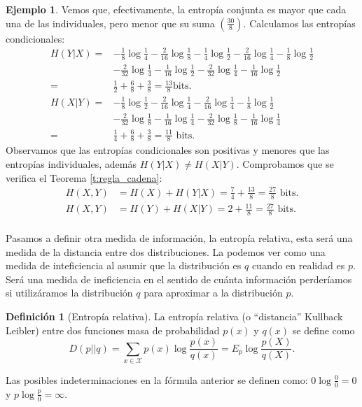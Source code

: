 \documentclass[10pt,a4paper]{article} %
\theoremstyle{definition}
\newtheorem{definition}{Definición}[section]
\newtheorem{example}[theorem]{Ejemplo}
\begin{document}
\begin{example}
  Vemos que, efectivamente, la entropía conjunta es mayor que cada una de las individuales, pero menor que su suma $\left( \frac{30}{8} \right )$. Calculamos las entropías condicionales:
  \begin{align*}
    H(Y|X) = &- \frac{1}{8} \log \frac{1}{4} - \frac{2}{16} \log\frac{1}{8} - \frac{1}{4} \log \frac{1}{2} - \frac{2}{16} \log \frac{1}{4} - \frac{1}{8} \log \frac{1}{2}\\
    &- \frac{2}{32} \log \frac{1}{4} - \frac{1}{16} \log \frac{1}{2} - \frac{2}{32} \log \frac{1}{4} - \frac{1}{16} \log \frac{1}{2}\\
    =& \frac{1}{2} + \frac{6}{8} + \frac{3}{8} = \frac{13}{8} \text {bits}.\\
    H(X|Y) = & - \frac{1}{8} \log \frac{1}{2} - \frac{2}{16} \log \frac{1}{4}- \frac{2}{16} \log \frac{1}{4} - \frac{1}{8} \log \frac{1}{2}\\
    &- \frac{2}{32} \log \frac{1}{8} - \frac{1}{16} \log \frac{1}{4} - \frac{2}{32} \log \frac{1}{8} - \frac{1}{16} \log \frac{1}{4}\\
    =& \frac{1}{4} + \frac{6}{8} + \frac{3}{8} = \frac{11}{8} \text{ bits}.
  \end{align*}
  Observamos que las entropías condicionales son positivas y menores que las entropías individuales, además $H(Y|X) \neq H(X|Y)$. Comprobamos que se verifica el Teorema \ref{t:regla_cadena}:
  \begin{align*}
    H(X,Y) &= H(X) + H(Y|X) = \frac{7}{4} + \frac{13}{8} = \frac{27}{8} \text{ bits}.\\
    H(X,Y) &= H(Y) + H(X|Y) = 2 + \frac{11}{8} = \frac{27}{8} \text{ bits}.\\
  \end{align*}
\end{example}

Pasamos a definir otra medida de información, la entropía relativa, esta será una medida de la distancia entre dos distribuciones. La podemos ver como una medida de inteficiencia al asumir que la distribución es $q$ cuando en realidad es $p$. Será una medida de ineficiencia en el sentido de cuánta información perderíamos si utilizáramos la distribución $q$ para aproximar a la distribución $p$.

\begin{definition}[Entropía relativa]
  La entropía relativa (o ``distancia'' Kullback Leibler) entre dos funciones masa de probabilidad $p(x)$ y $q(x)$ se define como\[
D(p||q) = \sum_{x \in \mathcal{X}}p(x) \log \frac{p(x)}{q(x)} = E_p \log \frac{p(X)}{q(X)}.
  \]
\end{definition}
Las posibles indeterminaciones en la fórmula anterior se definen como: $0 \log \frac{0}{0} = 0$ y $p \log \frac{p}{0} = \infty$.
\end{document}
